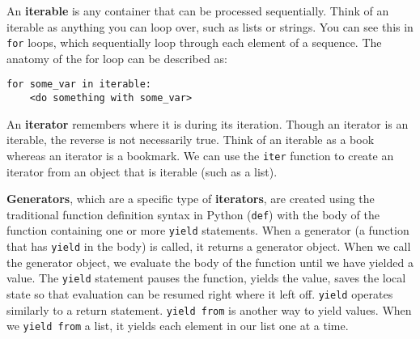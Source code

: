 An \textbf{iterable} is any container that can be processed sequentially. Think of an iterable as anything you can loop over, such as lists or strings.  You can see this in \lstinline{for} loops, which sequentially loop through each element of a sequence. The anatomy of the for loop can be described as:
\begin{lstlisting}
for some_var in iterable:
    <do something with some_var>
\end{lstlisting}
An \textbf{iterator} remembers where it is during its iteration. Though an iterator is an iterable, the reverse is not necessarily true. Think of an iterable as a book whereas an iterator is a bookmark. We can use the \lstinline{iter} function to create an iterator from an object that is iterable (such as a list). 

\textbf{Generators}, which are a specific type of \textbf{iterators}, are created using the traditional function definition syntax in Python (\lstinline{def}) with the body of the function containing one or more \lstinline{yield} statements. When a generator (a function that has \lstinline{yield} in the body) is called, it returns a generator object. When we call the generator object, we evaluate the body of the function until we have yielded a value. The \lstinline{yield} statement pauses the function, yields the value, saves the local state so that evaluation can be resumed right where it left off.  \lstinline{yield} operates similarly to a return statement. \lstinline{yield from} is another way to yield values. When we \lstinline{yield from} a list, it yields each element in our list one at a time. 